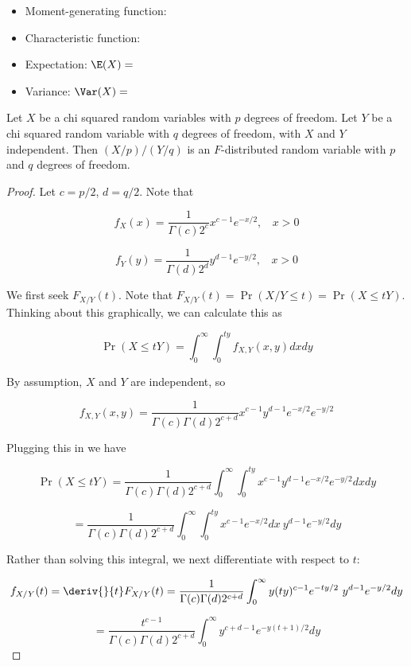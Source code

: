 \begin{itemize}
\begin{itemize}
\item Moment-generating function:

\item Characteristic function:

\item Expectation: \(\E(X) = \)

\item Variance: \(\Var(X) = \)

\end{itemize}

\begin{proposition} Let $X$ be a chi squared random variables with $p$ degrees of freedom. Let $Y$ be a chi squared random variable with $q$ degrees of freedom, with $X$ and $Y$ independent. Then $(X/p)/(Y/q)$ is an \(F\)-distributed random variable with $p$ and $q$ degrees of freedom. \end{proposition}

\begin{proof}

Let \(c = p/2\), \(d = q/2\). Note that

\[
f_X(x) = \frac{1}{\Gamma(c)2^c}x^{c-1}e^{-x/2}, \ \ \ \ x > 0
\]

\[
f_Y(y) = \frac{1}{\Gamma(d)2^d}y^{d-1}e^{-y/2}, \ \ \ \ x > 0
\]

We first seek \(F_{X/Y}(t)\). Note that \( F_{X/Y}(t) = \Pr(X/Y \leq t) = \Pr(X \leq tY)\). Thinking about this graphically, we can calculate this as

\[
 \Pr(X \leq tY) = \int_0^\infty \int_0^{ty}  f_{X,Y}(x,y)    dx dy
\]

By assumption, \(X\) and \(Y\) are independent, so

\[
f_{X,Y}(x,y) = \frac{1}{\Gamma(c)\Gamma(d)2^{c+d}}x^{c-1}y^{d-1}e^{-x/2}e^{-y/2}
\]

Plugging this in we have

\[
 \Pr(X \leq tY) =   \frac{1}{\Gamma(c)\Gamma(d)2^{c+d}} \int_0^\infty \int_0^{ty}x^{c-1}y^{d-1}e^{-x/2}e^{-y/2}   dx dy
\]

\[
=   \frac{1}{\Gamma(c)\Gamma(d)2^{c+d}} \int_0^\infty \int_0^{ty}x^{c-1}e^{-x/2}  dx  \ y^{d-1} e^{-y/2}  dy
\]

Rather than solving this integral, we next differentiate with respect to \(t\):

\[
f_{X/Y}(t) = \deriv{}{t} F_{X/Y}(t) =    \frac{1}{\Gamma(c)\Gamma(d)2^{c+d}} \int_0^\infty y (ty)^{c-1}e^{-ty/2}    \ y^{d-1} e^{-y/2} dy 
\]

\begin{equation}\label{prob.541a.hw3.9a}
=    \frac{t^{c-1}}{\Gamma(c)\Gamma(d)2^{c+d}} \int_0^\infty  y^{c+d-1} e^{-y(t+1)/2} dy 
\end{equation}


\end{proof}
\end{itemize}
